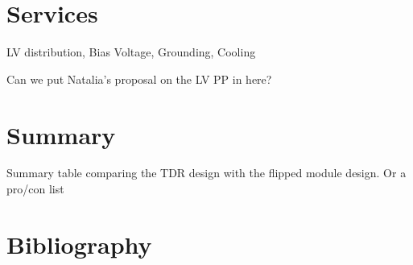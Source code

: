 \documentclass[11pt]{article}
\begin{document}
\section{Services}

LV distribution, Bias Voltage, Grounding, Cooling

Can we put Natalia's proposal on the LV PP in here?

\section{Summary}

Summary table comparing the TDR design with the flipped module design. Or a pro/con list

\section{Bibliography}
\end{document}
